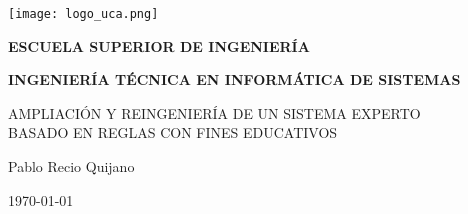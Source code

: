 

\begin{titlepage}

  \begin{center}

    \texttt{[image: logo\_uca.png]} \\
    
    \vspace{2.0cm}
    
    \LARGE{\textbf{ESCUELA SUPERIOR DE INGENIERÍA}} \\
    
    \vspace{1.0cm}
    
    \Large{\textbf{INGENIERÍA TÉCNICA EN INFORMÁTICA DE SISTEMAS}} \\
    
    \vspace{3.0cm}
    
    \Large{AMPLIACIÓN Y REINGENIERÍA DE UN SISTEMA EXPERTO\\BASADO EN REGLAS CON FINES EDUCATIVOS} \\
    
    \vspace{2.0cm}
    
    \Large{Pablo Recio Quijano} \\
  
    \vspace{0.5cm}

    \large{\today}
    
  \end{center}
\end{titlepage}
